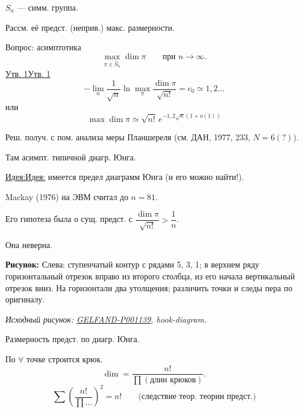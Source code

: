 \documentclass[11pt]{article}
\theoremstyle{definition}
\theoremstyle{remark}
\newcommand{\SourceFigure}[3]{%
  \par\begingroup\color{blue!60!black}\textbf{\hyperref[#1:source-page]{Source figure #1/#2}:} #3%
  \par\textit{Consult the authoritative scan at this locator.}\endgroup\par%
}
\renewcommand{\SourceFigure}[3]{%
  \par\begingroup\color{blue!55!black}\textbf{Рисунок:} #3%
  \par{\small\textit{Исходный рисунок: \hyperref[#1:source-page]{#1}, #2.}}%
  \endgroup\par%
}
\let\DiplomaticMathUnderline\underline
\renewcommand{\underline}[1]{\ifmmode\DiplomaticMathUnderline{#1}\else\uline{#1}\fi}
\begin{document}
$S_n$ — симм. группа.

Рассм. её предст. (неприв.) макс. размерности.

Вопрос: асимптотика
\begin{equation*}
\max_{\pi\in\widehat S_n}\dim\pi\qquad\text{при }n\longrightarrow\infty.
\tag{1}
\end{equation*}
\underline{Утв. 1}
\begin{equation*}
-\lim_n\frac{1}{\sqrt n}\ln\max_\pi\frac{\dim\pi}{\sqrt{n!}}
 =c_0\simeq1{,}2\ldots
\tag{2}
\end{equation*}
или
\begin{equation*}
\max\dim\pi\simeq\sqrt{n!}\,e^{-1{,}2\sqrt n(1+o(1))}
\tag{2'}
\end{equation*}

Реш. получ. с пом. анализа меры Планшереля
(см. ДАН, 1977, 233, $N=6(?)$).

Там асимпт. типичной диагр. Юнга.

\underline{Идея:} имеется предел диаграмм Юнга (и его можно найти!).

Mackay (1976) на ЭВМ считал до $n=81$.

Его гипотеза была о сущ. предст. с $\dfrac{\dim\pi}{\sqrt{n!}}>\dfrac1n$.

Она неверна.

\SourceFigure{GELFAND-P001139}{hook-diagram}{Слева: ступенчатый контур с рядами 5, 3, 1; в верхнем ряду горизонтальный отрезок вправо из второго столбца, из его начала вертикальный отрезок вниз. На горизонтали два утолщения; различить точки и следы пера по оригиналу.}

Размерность предст. по диагр. Юнга.

По $\forall$ точке строится крюк.
\begin{equation*}
\dim=\frac{n!}{\prod(\text{длин крюков})}.
\end{equation*}
\begin{equation*}
\sum\left(\frac{n!}{\prod\ldots}\right)^2=n!
\qquad\text{(следствие теор. теории предст.)}
\end{equation*}
\end{document}
